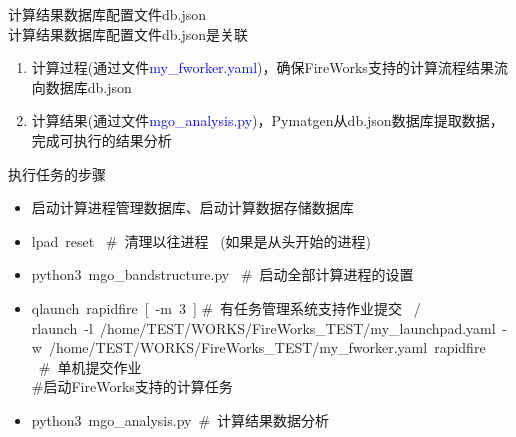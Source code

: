 \documentclass[10pt,a4paper]{article}
\begin{document}
计算结果数据库配置文件\textrm{db.json}\\
计算结果数据库配置文件\textrm{db.json}是关联
\begin{enumerate}
	\item 计算过程(通过文件\textcolor{blue}{\textrm{my\_fworker.yaml}})，确保\textrm{FireWorks}支持的计算流程结果流向数据库\textrm{db.json}
	\item 计算结果(通过文件\textcolor{blue}{\textrm{mgo\_analysis.py}})，\textrm{Pymatgen}从\textrm{db.json}数据库提取数据，完成可执行的结果分析
\end{enumerate}

执行任务的步骤
\begin{itemize}
	\item 启动计算进程管理数据库、启动计算数据存储数据库
	\item \textrm{lpad~reset} ~\#~清理以往进程 ~(如果是从头开始的进程)
	\item \textrm{python3~mgo\_bandstructure.py} ~\#~启动全部计算进程的设置
	\item \textrm{qlaunch~rapidfire~[~-m~3~] \#~有任务管理系统支持作业提交 ~/\\
		rlaunch~-l~/home/TEST/WORKS/FireWorks\_TEST/my\_launchpad.yaml~-w~/home/TEST/WORKS/FireWorks\_TEST/my\_fworker.yaml~rapidfire} ~\#~单机提交作业\\ 
		\#启动\textrm{FireWorks}支持的计算任务
	\item \textrm{python3~mgo\_analysis.py}~\#~计算结果数据分析
\end{itemize}
\end{document}

